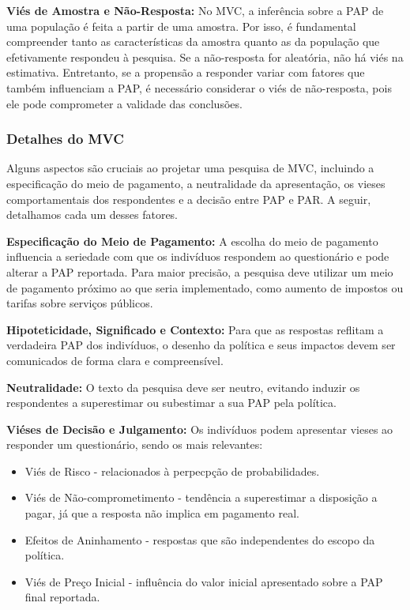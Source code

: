 \documentclass[12pt,letterpaper]{article}
\newcommand{\1}{\mathbbm{1}}
\numberwithin{equation}{section}
\begin{document}
\textbf{Viés de Amostra e Não-Resposta:} No MVC, a inferência sobre a PAP de uma população é feita a partir de uma amostra. Por isso, é fundamental compreender tanto as características da amostra quanto as da população que efetivamente respondeu à pesquisa. Se a não-resposta for aleatória, não há viés na estimativa. Entretanto, se a propensão a responder variar com fatores que também influenciam a PAP, é necessário considerar o viés de não-resposta, pois ele pode comprometer a validade das conclusões.

\subsubsection{Detalhes do MVC}

Alguns aspectos são cruciais ao projetar uma pesquisa de MVC, incluindo a especificação do meio de pagamento, a neutralidade da apresentação, os vieses comportamentais dos respondentes e a decisão entre PAP e PAR. A seguir, detalhamos cada um desses fatores.

\textbf{Especificação do Meio de Pagamento:} A escolha do meio de pagamento influencia a seriedade com que os indivíduos respondem ao questionário e pode alterar a PAP reportada. Para maior precisão, a pesquisa deve utilizar um meio de pagamento próximo ao que seria implementado, como aumento de impostos ou tarifas sobre serviços públicos.

\textbf{Hipoteticidade, Significado e Contexto:} Para que as respostas reflitam a verdadeira PAP dos indivíduos, o desenho da política e seus impactos devem ser comunicados de forma clara e compreensível.

\textbf{Neutralidade:} O texto da pesquisa deve ser neutro, evitando induzir os respondentes a superestimar ou subestimar a sua PAP pela política.

\textbf{Viéses de Decisão e Julgamento:} Os indivíduos podem apresentar vieses ao responder um questionário, sendo os mais relevantes:
\begin{itemize}
    \item Viés de Risco - relacionados à perpecpção de probabilidades.
    \item Viés de Não-comprometimento - tendência a superestimar a disposição a pagar, já que a resposta não implica em pagamento real.
    \item Efeitos de Aninhamento - respostas que são independentes do escopo da política.
    \item Viés de Preço Inicial - influência do valor inicial apresentado sobre a PAP final reportada.
\end{itemize}
\end{document}
